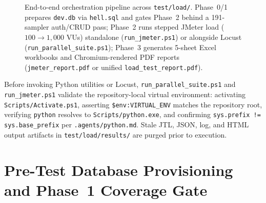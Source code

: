 \documentclass[11pt,letterpaper]{article}
\begin{document}
\begin{figure}[H]
{%
}
\caption{End-to-end orchestration pipeline across \texttt{test/load/}. Phase~0/1 prepares \texttt{dev.db} via \texttt{hell.sql} and gates Phase~2 behind a 191-sampler auth/CRUD pass; Phase~2 runs stepped JMeter load ($100\to 1{,}000$ VUs) standalone (\texttt{run\_jmeter.ps1}) or alongside Locust (\texttt{run\_parallel\_suite.ps1}); Phase~3 generates 5-sheet Excel workbooks and Chromium-rendered PDF reports (\texttt{jmeter\_report.pdf} or unified \texttt{load\_test\_report.pdf}).}
\label{fig:architecture}
\end{figure}

Before invoking Python utilities or Locust, \texttt{run\_parallel\_suite.ps1} and \texttt{run\_jmeter.ps1} validate the repository-local virtual environment: activating \texttt{Scripts/\allowbreak Activate.ps1}, asserting \texttt{\$env:VIRTUAL\_ENV} matches the repository root, verifying \texttt{python} resolves to \texttt{Scripts/\allowbreak python.exe}, and confirming \texttt{sys.prefix != \allowbreak sys.base\_prefix} per \texttt{.agents/\allowbreak python.md}. Stale JTL, JSON, log, and HTML output artifacts in \texttt{test/load/results/} are purged prior to execution.

\section{Pre-Test Database Provisioning and Phase~1 Coverage Gate}
\end{document}
